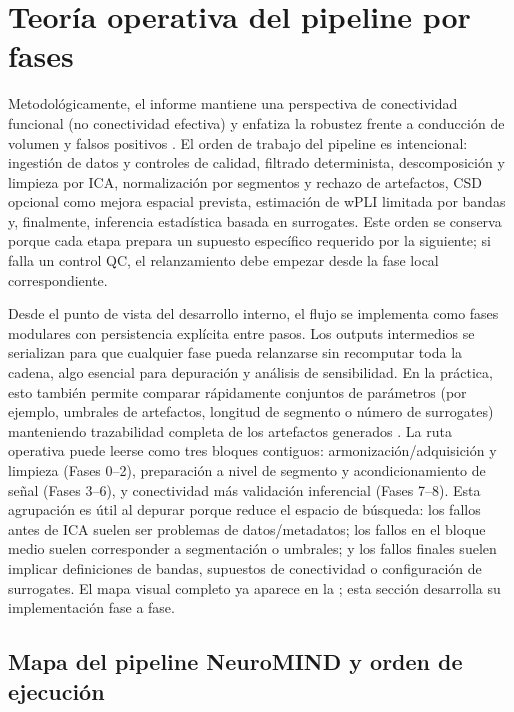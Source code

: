 \section{Teoría operativa del pipeline por fases}

Metodológicamente, el informe mantiene una perspectiva de conectividad funcional (no conectividad efectiva) y enfatiza la robustez frente a conducción de volumen y falsos positivos \citep{Cohen2014,Vinck2011WPLI,Cao2022EEGConnectivity}. El orden de trabajo del pipeline es intencional: ingestión de datos y controles de calidad, filtrado determinista, descomposición y limpieza por ICA, normalización por segmentos y rechazo de artefactos, CSD opcional como mejora espacial prevista, estimación de wPLI limitada por bandas y, finalmente, inferencia estadística basada en surrogates. Este orden se conserva porque cada etapa prepara un supuesto específico requerido por la siguiente; si falla un control QC, el relanzamiento debe empezar desde la fase local correspondiente.

Desde el punto de vista del desarrollo interno, el flujo se implementa como fases modulares con persistencia explícita entre pasos. Los outputs intermedios se serializan para que cualquier fase pueda relanzarse sin recomputar toda la cadena, algo esencial para depuración y análisis de sensibilidad. En la práctica, esto también permite comparar rápidamente conjuntos de parámetros (por ejemplo, umbrales de artefactos, longitud de segmento o número de surrogates) manteniendo trazabilidad completa de los artefactos generados \citep{Blinowska-Cieslak2022,Sanei2022}.
La ruta operativa puede leerse como tres bloques contiguos: armonización/adquisición y limpieza (Fases 0--2), preparación a nivel de segmento y acondicionamiento de señal (Fases 3--6), y conectividad más validación inferencial (Fases 7--8). Esta agrupación es útil al depurar porque reduce el espacio de búsqueda: los fallos antes de ICA suelen ser problemas de datos/metadatos; los fallos en el bloque medio suelen corresponder a segmentación o umbrales; y los fallos finales suelen implicar definiciones de bandas, supuestos de conectividad o configuración de surrogates. El mapa visual completo ya aparece en la ; esta sección desarrolla su implementación fase a fase.

\subsection{Mapa del pipeline NeuroMIND y orden de ejecución}

